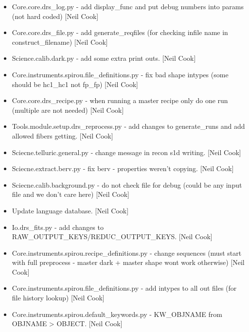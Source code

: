 \documentclass[a4paper,10pt,english]{report}
\begin{document}
\begin{itemize}
\item {} 
Core.core.drs\_log.py - add display\_func and put debug numbers into
params (not hard coded) {[}Neil Cook{]}

\item {} 
Core.core.drs\_file.py - add generate\_reqfiles (for checking infile
name in construct\_filename) {[}Neil Cook{]}

\item {} 
Science.calib.dark.py - add some extra print outs. {[}Neil Cook{]}

\item {} 
Core.instruments.spirou.file\_definitions.py - fix bad shape intypes
(some should be hc1\_hc1 not fp\_fp) {[}Neil Cook{]}

\item {} 
Core.core.drs\_recipe.py - when running a master recipe only do one run
(multiple are not needed) {[}Neil Cook{]}

\item {} 
Tools.module.setup.drs\_reprocess.py - add changes to generate\_runs and
add allowed fibers getting. {[}Neil Cook{]}

\item {} 
Sciecne.telluric.general.py - change message in recon s1d writing.
{[}Neil Cook{]}

\item {} 
Sciecne.extract.berv.py - fix berv - properties weren’t copying. {[}Neil
Cook{]}

\item {} 
Sciecne.calib.background.py - do not check file for debug (could be
any input file and we don’t care here) {[}Neil Cook{]}

\item {} 
Update language database. {[}Neil Cook{]}

\item {} 
Io.drs\_fits.py - add changes to RAW\_OUTPUT\_KEYS/REDUC\_OUTPUT\_KEYS.
{[}Neil Cook{]}

\item {} 
Core.instruments.spirou.recipe\_definitions.py - change sequences (must
start with full preprocess - master dark + master shape wont work
otherwise) {[}Neil Cook{]}

\item {} 
Core.instruments.spirou.file\_definitions.py - add intypes to all out
files (for file history lookup) {[}Neil Cook{]}

\item {} 
Core.instruments.spirou.default\_keywords.py - KW\_OBJNAME from OBJNAME
\textendash{}\textgreater{} OBJECT. {[}Neil Cook{]}


\end{itemize}
\end{document}
